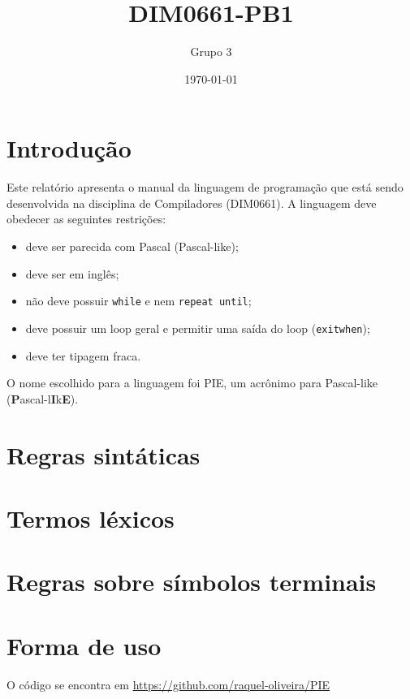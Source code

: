 \documentclass[12pt]{report}
\title{DIM0661-PB1}
\author{Grupo 3}
\date{\today}
\begin{document}
\maketitle

\tableofcontents

\chapter{Introdução}
Este relatório apresenta o manual da linguagem de programação que está sendo desenvolvida na disciplina de Compiladores (DIM0661). A linguagem deve obedecer as seguintes restrições:

\begin{changemargin}{1cm}{1cm}
\begin{itemize}
    \item deve ser parecida com Pascal (Pascal-like);
    \item deve ser em inglês;
    \item não deve possuir \texttt{while} e nem \texttt{repeat until};
    \item deve possuir um loop geral e permitir uma saída do loop (\texttt{exitwhen});
    \item deve ter tipagem fraca.
\end{itemize}
\end{changemargin}

O nome escolhido para a linguagem foi PIE, um acrônimo para Pascal-like (\textbf{P}ascal-l\textbf{I}k\textbf{E}).

\chapter{Regras sintáticas}


\newpage
\chapter{Termos léxicos}


\newpage
\chapter{Regras sobre símbolos terminais}


\newpage
\chapter{Forma de uso}
O código se encontra em \url{https://github.com/raquel-oliveira/PIE}
\end{document}
